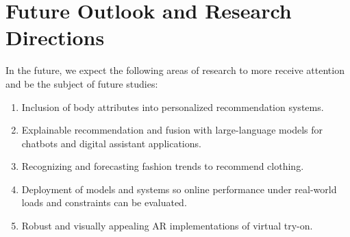 \section{Future Outlook and Research Directions} \label{section:future}
	In the future, we expect the following areas of research to more receive attention and be the subject of future studies:

	\begin{enumerate}
		\item Inclusion of body attributes into personalized recommendation systems.
		\item Explainable recommendation and fusion with large-language models for chatbots and digital assistant applications.
		\item Recognizing and forecasting fashion trends to recommend clothing.
		\item Deployment of models and systems so online performance under real-world loads and constraints can be evaluated.
		\item Robust and visually appealing AR implementations of virtual try-on.
	\end{enumerate}